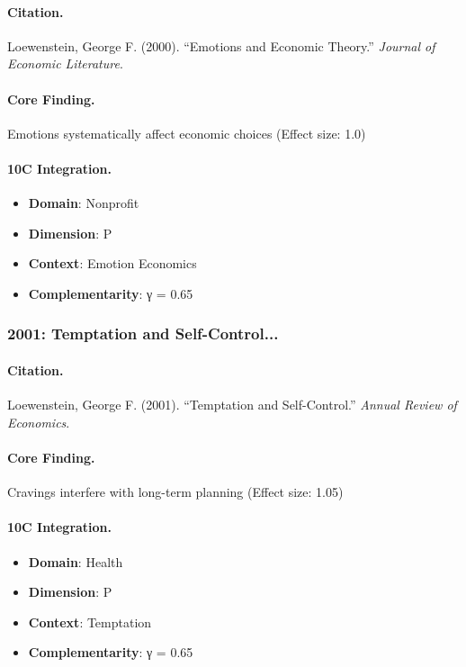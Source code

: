 \paragraph{Citation.}
Loewenstein, George F. (2000). ``Emotions and Economic Theory.''
\textit{Journal of Economic Literature}.

\paragraph{Core Finding.}
Emotions systematically affect economic choices (Effect size: 1.0)

\paragraph{10C Integration.}
\begin{itemize}[nosep]
  \item \textbf{Domain}: Nonprofit
  \item \textbf{Dimension}: P
  \item \textbf{Context}: Emotion Economics
  \item \textbf{Complementarity}: γ = 0.65
\end{itemize}

\subsubsection{2001: Temptation and Self-Control...}

\paragraph{Citation.}
Loewenstein, George F. (2001). ``Temptation and Self-Control.''
\textit{Annual Review of Economics}.

\paragraph{Core Finding.}
Cravings interfere with long-term planning (Effect size: 1.05)

\paragraph{10C Integration.}
\begin{itemize}[nosep]
  \item \textbf{Domain}: Health
  \item \textbf{Dimension}: P
  \item \textbf{Context}: Temptation
  \item \textbf{Complementarity}: γ = 0.65
\end{itemize}

